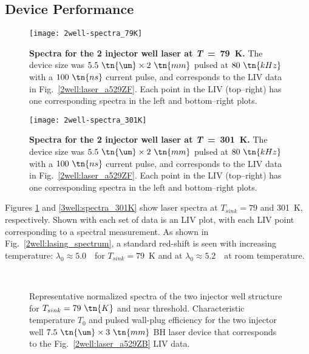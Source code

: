 \subsection{Device Performance}

\begin{figure}[tp]
\centering
\texttt{[image: 2well-spectra\_79K]}
\caption[Spectra for the 2 injector well laser at $T_{sink}=79~\tn{K}$]{\textnormal{\textbf{Spectra for the 2 injector well laser at \textit{T}~=~79~K.}}  The device size was $5.5~\tn{\um} \times 2~\tn{mm}$ pulsed at $80~\tn{kHz}$ with a $100~\tn{ns}$ current pulse, and corresponds to the LIV data in Fig.~\ref{2well:laser_a529ZF}.  Each point in the LIV (top--right) has one corresponding spectra in the left and bottom--right plots.}
\label{2well:spectra_79K}
\end{figure}

\begin{figure}[tp]
\centering
\texttt{[image: 2well-spectra\_301K]}
\caption[Spectra for the 2 injector well laser at $T_{sink}=301~\tn{K}$]{\textnormal{\textbf{Spectra for the 2 injector well laser at \textit{T}~=~301~K.}}  The device size was $5.5~\tn{\um} \times 2~\tn{mm}$ pulsed at $80~\tn{kHz}$ with a $100~\tn{ns}$ current pulse, and corresponds to the LIV data in Fig.~\ref{2well:laser_a529ZF}.  Each point in the LIV (top--right) has one corresponding spectra in the left and bottom--right plots.}
\label{2well:spectra_301K}
\end{figure}

Figures \ref{2well:spectra_79K} and \ref{3well:spectra_301K} show laser spectra at $T_{sink}=79$ and 301~K, respectively.  Shown with each set of data is an LIV plot, with each LIV point corresponding to a spectral measurement.  As shown in Fig.~\ref{2well:lasing_spectrum}, a standard red-shift is seen with increasing temperature: $\lambda_0\approx5.0$~\um\ for $T_{sink}=79$~K and at $\lambda_0\approx5.2$~\um\ at room temperature.

\begin{figure}[tp]%
\centering%
%
\\%
\vspace*{-0.1in}%
%
\hfil%
%
\caption[Performance data for the two injector well structure]{  Representative normalized spectra of the two injector well structure for $T_{sink}=79~\tn{K}$ and  near threshold.  Characteristic temperature $T_0$  and pulsed wall-plug efficiency  for the two injector well $7.5~\tn{\um}\times3~\tn{mm}$ BH laser device that corresponds to the Fig.~\ref{2well:laser_a529ZB} LIV data.}%
\label{2well:performance}%
\end{figure}

